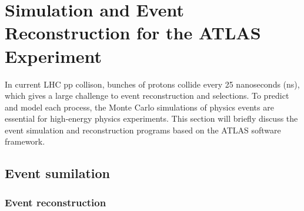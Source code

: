 \chapter{Simulation and Event Reconstruction for the ATLAS Experiment}

In current LHC pp collison, bunches of protons collide every 25 nanoseconds (ns), which gives a large challenge to event reconstruction and selections.
To predict and model each process, the Monte Carlo simulations of physics events are essential for high-energy physics experiments.
This section will briefly discuss the event simulation and reconstruction programs based on the ATLAS software framework. 

\section{Event sumilation}


\subsection{Event reconstruction}


